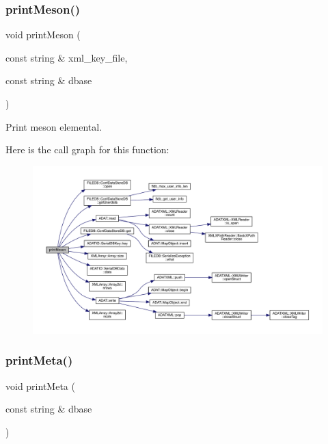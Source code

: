 \subsubsection{\texorpdfstring{printMeson()}{printMeson()}}
{\footnotesize\ttfamily void print\+Meson (\begin{DoxyParamCaption}\item[{const string \&}]{xml\+\_\+key\+\_\+file,  }\item[{const string \&}]{dbase }\end{DoxyParamCaption})}



Print meson elemental. 

Here is the call graph for this function\+:
\nopagebreak
\begin{figure}[H]
\begin{center}
\leavevmode
\includegraphics[width=350pt]{d5/d55/adat-devel_2main_2dbutil_2dbutil_8cc_a562fa6116f55a7f0dbfe8ca08e136460_cgraph}
\end{center}
\end{figure}
\mbox{\label{adat-devel_2main_2dbutil_2dbutil_8cc_a0577d572da492642f9cf5f404d0116d9}} 
\subsubsection{\texorpdfstring{printMeta()}{printMeta()}}
{\footnotesize\ttfamily void print\+Meta (\begin{DoxyParamCaption}\item[{const string \&}]{dbase }\end{DoxyParamCaption})}



